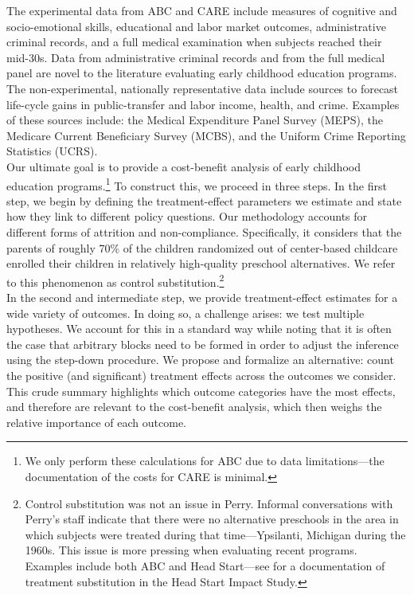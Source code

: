 \noindent The experimental data from ABC and CARE include measures of cognitive and socio-emotional skills, educational and labor market outcomes, administrative criminal records, and a full medical examination when subjects reached their mid-30s. Data from administrative criminal records and from the full medical panel are novel to the literature evaluating early childhood education programs. The non-experimental, nationally representative data include sources to forecast life-cycle gains in public-transfer and labor income, health, and crime. Examples of these sources include: the Medical Expenditure Panel Survey (MEPS), the Medicare Current Beneficiary Survey (MCBS), and the Uniform Crime Reporting Statistics (UCRS).\\

\noindent Our ultimate goal is to provide a cost-benefit analysis of early childhood education programs.\footnote{We only perform these calculations for ABC due to data limitations---the documentation of the costs for  CARE is minimal.} To construct this, we proceed in three steps. In the first step, we begin by defining the treatment-effect parameters we estimate and state how they link to different policy questions. Our methodology accounts for different forms of attrition and non-compliance. Specifically, it considers that the parents of roughly 70\% of the children randomized out of center-based childcare enrolled their children in relatively high-quality preschool alternatives. We refer to this phenomenon as control substitution.\footnote{Control  substitution was not an issue in Perry. Informal conversations with Perry's staff indicate that there were no alternative preschools in the area in which subjects were treated during that time---Ypsilanti, Michigan during the 1960s. This issue is more pressing when evaluating recent programs. Examples include both ABC and Head Start---see \citep{Puma_Bell_etal_2010_HeadStartImpact} for a documentation of treatment substitution in the Head Start Impact Study.}\\

\noindent In the second and intermediate step, we provide treatment-effect estimates for a wide variety of outcomes. In doing so, a challenge arises: we test multiple hypotheses. We account for this in a standard way \citep{Lehman_Romano_2005_AnnStat,Romano_Shaikh_2006_AnnStat} while noting that it is often the case that arbitrary blocks need to be formed in order to adjust the inference using the step-down procedure. We propose and formalize an alternative: count the positive (and significant) treatment effects across the outcomes we consider. This crude summary highlights which outcome categories have the most effects, and therefore are relevant to the cost-benefit analysis, which then weighs the relative importance of each outcome.\\ 

